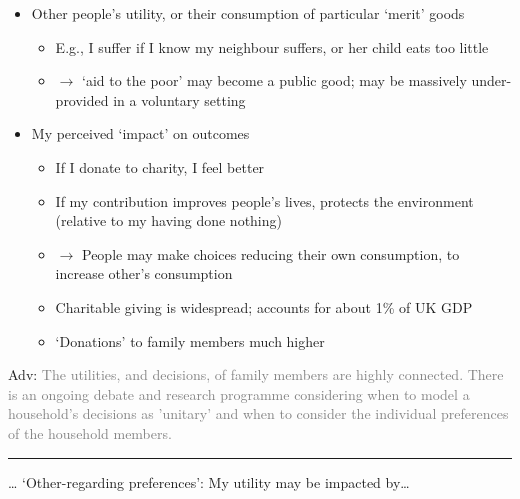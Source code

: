 \documentclass[]{article}
\providecommand{\tightlist}{%
  \setlength{\itemsep}{0pt}\setlength{\parskip}{0pt}}
\begin{document}
\begin{itemize}
\tightlist
\item
  Other people's utility, or their consumption of particular `merit' goods

  \begin{itemize}
  \tightlist
  \item
    E.g., I suffer if I know my neighbour suffers, or her child eats too little
  \item
    \(\rightarrow\) `aid to the poor' may become a public good; may be massively under-provided in a voluntary setting
  \end{itemize}
\item
  My perceived `impact' on outcomes

  \begin{itemize}
  \tightlist
  \item
    If I donate to charity, I feel better
  \item
    If my contribution improves people's lives, protects the environment (relative to my having done nothing)
  \item
    \(\rightarrow\) People may make choices reducing their own consumption, to increase other's consumption
  \item
    Charitable giving is widespread; accounts for about 1\% of UK GDP
  \item
    `Donations' to family members much higher
  \end{itemize}
\end{itemize}

\textcolor{RawSienna}{Adv:} \textcolor{gray}{The utilities, and decisions, of family members are highly connected. There is an ongoing debate and research programme considering when to model a household's decisions as 'unitary' and when to consider the individual preferences of the household members.}

\begin{center}\rule{0.5\linewidth}{\linethickness}\end{center}

\ldots{} `Other-regarding preferences': My utility may be impacted by\ldots{}
\end{document}
